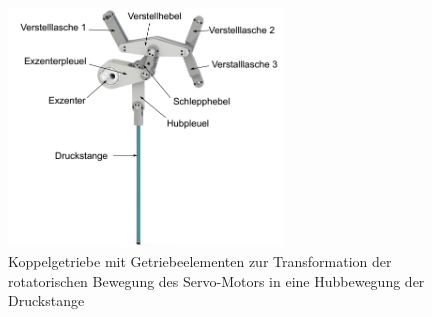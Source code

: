 \begin{figure} [h]
	\centering
	\includegraphics[width=0.65\textwidth]{images/exzenter}
	\caption{Koppelgetriebe mit Getriebeelementen zur Transformation der rotatorischen Bewegung des Servo-Motors in eine Hubbewegung der Druckstange \cite{Rakowitsch.2018}}
	\label{fig:koppel}
\end{figure}


